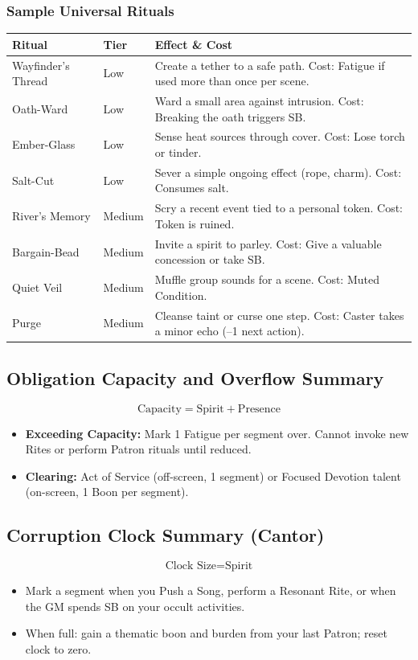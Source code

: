 \subsubsection{Sample Universal Rituals}

\begin{tabular}{@{}p{3cm}p{2cm}p{8cm}@{}}
\toprule
\textbf{Ritual} & \textbf{Tier} & \textbf{Effect \& Cost} \\
\midrule
Wayfinder's Thread & Low & Create a tether to a safe path. Cost: Fatigue if used more than once per scene. \\
Oath-Ward & Low & Ward a small area against intrusion. Cost: Breaking the oath triggers SB. \\
Ember-Glass & Low & Sense heat sources through cover. Cost: Lose torch or tinder. \\
Salt-Cut & Low & Sever a simple ongoing effect (rope, charm). Cost: Consumes salt. \\
River's Memory & Medium & Scry a recent event tied to a personal token. Cost: Token is ruined. \\
Bargain-Bead & Medium & Invite a spirit to parley. Cost: Give a valuable concession or take SB. \\
Quiet Veil & Medium & Muffle group sounds for a scene. Cost: Muted Condition. \\
Purge & Medium & Cleanse taint or curse one step. Cost: Caster takes a minor echo (–1 next action). \\
\bottomrule
\end{tabular}

\subsection{Obligation Capacity and Overflow Summary}

\[
\text{Capacity} = \text{Spirit} + \text{Presence}
\]

\begin{itemize}
  \item \textbf{Exceeding Capacity:} Mark 1 Fatigue per segment over. Cannot invoke new Rites or perform Patron rituals until reduced.
  \item \textbf{Clearing:} Act of Service (off-screen, 1 segment) or Focused Devotion talent (on-screen, 1 Boon per segment).
\end{itemize}

\subsection{Corruption Clock Summary (Cantor)}

\[
\text{Clock Size} = \text{Spirit}
\]

\begin{itemize}
  \item Mark a segment when you Push a Song, perform a Resonant Rite, or when the GM spends SB on your occult activities.
  \item When full: gain a thematic boon and burden from your last Patron; reset clock to zero.
\end{itemize}

